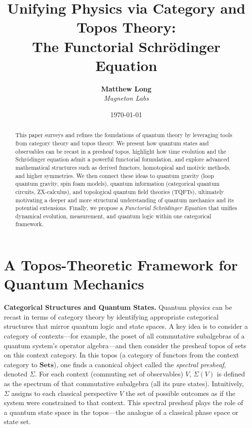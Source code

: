 \documentclass[12pt]{article}
\title{\textbf{Unifying Physics via Category and Topos Theory: \\ 
The Functorial Schrödinger Equation}}
\author{
  \textbf{Matthew Long} \\
  \emph{Magneton Labs}
}
\date{\today}
\begin{document}
\maketitle

\begin{abstract}
This paper surveys and refines the foundations of quantum theory by leveraging tools from category theory and topos theory. We present how quantum states and observables can be recast in a presheaf topos, highlight how time evolution and the Schrödinger equation admit a powerful functorial formulation, and explore advanced mathematical structures such as derived functors, homotopical and motivic methods, and higher symmetries. We then connect these ideas to quantum gravity (loop quantum gravity, spin foam models), quantum information (categorical quantum circuits, ZX-calculus), and topological quantum field theories (TQFTs), ultimately motivating a deeper and more structural understanding of quantum mechanics and its potential extensions. Finally, we propose a \emph{Functorial Schrödinger Equation} that unifies dynamical evolution, measurement, and quantum logic within one categorical framework.
\end{abstract}

\tableofcontents


\section{A Topos-Theoretic Framework for Quantum Mechanics}

\textbf{Categorical Structures and Quantum States.} Quantum physics can be recast in terms of category theory by identifying appropriate categorical structures that mirror quantum logic and state spaces. A key idea is to consider a category of contexts---for example, the poset of all commutative subalgebras of a quantum system’s operator algebra---and then consider the presheaf topos of sets on this context category. In this topos (a category of functors from the context category to $\mathbf{Sets}$), one finds a canonical object called the \emph{spectral presheaf}, denoted $\Sigma$. For each context (commuting set of observables) $V$, $\Sigma(V)$ is defined as the spectrum of that commutative subalgebra (all its pure states). Intuitively, $\Sigma$ assigns to each classical perspective $V$ the set of possible outcomes as if the system were constrained to that context. This spectral presheaf plays the role of a quantum state space in the topos---the analogue of a classical phase space or state set. 
\end{document}
